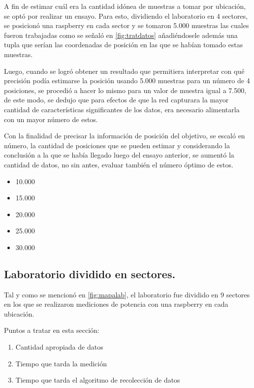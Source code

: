 A fin de estimar cuál era la cantidad idónea de muestras a tomar por ubicación, se optó por realizar un ensayo. Para esto, dividiendo el laboratorio en 4 sectores, se posicionó una raspberry en cada sector y se tomaron 5.000 muestras las cuales fueron trabajadas como se señaló en \ref{fig:tratdatos} añadiéndosele además una tupla que serían las coordenadas de posición en las que se habían tomado estas muestras. 

Luego, cuando se logró obtener un resultado que permitiera interpretar con qué precisión podía estimarse la posición usando 5.000 muestras para un número de 4 posiciones, se procedió a hacer lo mismo para un valor de muestra igual a 7.500, de este modo, se dedujo que para efectos de que la red capturara la mayor cantidad de características significantes de los datos, era necesario alimentarla con un mayor número de estos. 


Con la finalidad de precisar la información de posición del objetivo, se escaló en número, la cantidad de posiciones que se pueden estimar y considerando la conclusión a la que se había llegado luego del ensayo anterior, se aumentó la cantidad de datos, no sin antes, evaluar también el número óptimo de estos.

\begin{itemize}
    \item {10.000}
    \item {15.000}
    \item {20.000}
    \item {25.000}
    \item {30.000}
\end{itemize}



\subsection{Laboratorio dividido en sectores.}

Tal y como se mencionó en \ref{fig:mapalab}, el laboratorio fue dividido en 9 sectores en los que se realizaron mediciones de potencia con una raspberry en cada ubicación.

Puntos a tratar en esta sección:
\begin{enumerate}
 \item {Cantidad apropiada de datos}
 \item{Tiempo que tarda la medición}
 \item{Tiempo que tarda el algoritmo de recolección de datos}
\end{enumerate}

